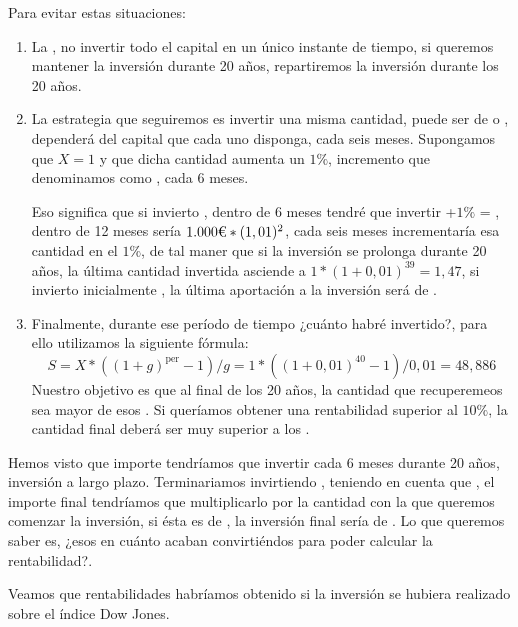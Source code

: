 Para evitar estas situaciones:
\begin{enumerate}
    \item La , no invertir todo el capital en un único instante de tiempo, si queremos mantener la inversión durante 20 años, repartiremos la inversión durante los 20 años.
    \item La estrategia que seguiremos es invertir una misma cantidad, puede ser de  o , dependerá del capital que cada uno disponga, cada seis meses. Supongamos que $X = 1$ y que dicha cantidad aumenta un $1\%$, incremento que denominamos como , cada 6 meses.
    
    Eso significa que si invierto , dentro de 6 meses tendré que invertir +$1\%$ = , dentro de 12 meses sería $\euros{1.000}\ast (1,01)^2$, cada seis meses incrementaría esa cantidad en el $1\%$, de tal maner que  si la inversión se prolonga durante 20 años, la última cantidad invertida asciende a $1\ast(1+0,01)^{39} = 1,47$, si invierto inicialmente , la última aportación a la inversión será de .
    \item Finalmente, durante ese período de tiempo ¿cuánto habré invertido?, para ello utilizamos la siguiente fórmula:
    $$S = X \ast ((1 + g)^{\text{per}}-1)/g = 1\ast ((1+0,01)^{40}-1)/0,01 = 48,886$$
    Nuestro objetivo es que al final de los 20 años, la cantidad que recuperemeos sea mayor de esos . Si queríamos obtener una rentabilidad superior al $10\%$, la cantidad final deberá ser muy superior a los .
\end{enumerate}

Hemos visto que importe tendríamos que invertir cada 6 meses durante 20 años, inversión a largo plazo. Terminariamos invirtiendo , teniendo en cuenta que , el importe final tendríamos que multiplicarlo por la cantidad con la que queremos comenzar la inversión, si ésta es de , la inversión final sería de . Lo que queremos saber es, ¿esos  en cuánto acaban convirtiéndos para poder calcular la rentabilidad?.

Veamos que rentabilidades habríamos obtenido si la inversión se hubiera realizado sobre el índice Dow Jones.

